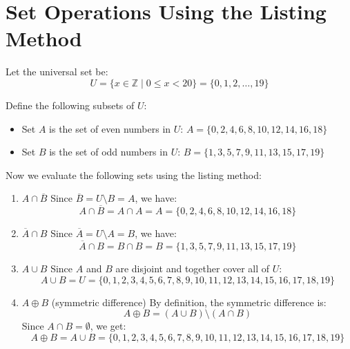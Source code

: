 \documentclass{article}
\begin{document}
\section*{Set Operations Using the Listing Method}

Let the universal set be:
\[
U = \{x \in \mathbb{Z} \mid 0 \leq x < 20\} = \{0, 1, 2, \ldots, 19\}
\]

Define the following subsets of \( U \):
\begin{itemize}
    \item Set \( A \) is the set of even numbers in \( U \):  
    \( A = \{0, 2, 4, 6, 8, 10, 12, 14, 16, 18\} \)
    \item Set \( B \) is the set of odd numbers in \( U \):  
    \( B = \{1, 3, 5, 7, 9, 11, 13, 15, 17, 19\} \)
\end{itemize}

Now we evaluate the following sets using the listing method:

\begin{enumerate}[label=\textbf{\arabic*.}]
    \item \( A \cap \overline{B} \)  
    Since \( \overline{B} = U \setminus B = A \), we have:  
    \[
    A \cap \overline{B} = A \cap A = A = \{0, 2, 4, 6, 8, 10, 12, 14, 16, 18\}
    \]

    \item \( \overline{A} \cap B \)  
    Since \( \overline{A} = U \setminus A = B \), we have:  
    \[
    \overline{A} \cap B = B \cap B = B = \{1, 3, 5, 7, 9, 11, 13, 15, 17, 19\}
    \]

    \item \( A \cup B \)  
    Since \( A \) and \( B \) are disjoint and together cover all of \( U \):  
    \[
    A \cup B = U = \{0, 1, 2, 3, 4, 5, 6, 7, 8, 9, 10, 11, 12, 13, 14, 15, 16, 17, 18, 19\}
    \]

    \item \( A \oplus B \) (symmetric difference)  
    By definition, the symmetric difference is:  
    \[
    A \oplus B = (A \cup B) \setminus (A \cap B)
    \]
    Since \( A \cap B = \emptyset \), we get:  
    \[
    A \oplus B = A \cup B = \{0, 1, 2, 3, 4, 5, 6, 7, 8, 9, 10, 11, 12, 13, 14, 15, 16, 17, 18, 19\}
    \]
\end{enumerate}
\end{document}

